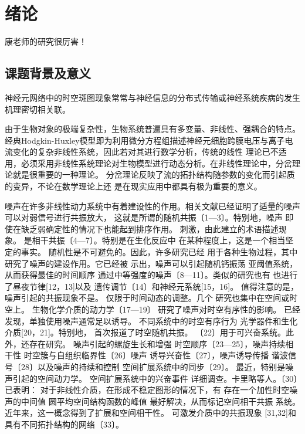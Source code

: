 \documentclass[
    bachelor,
    nofont, %
    pdflinks,
    ]{xjtuthesis}
\begin{document}
	
	
	
	
    \xjtucinfopage
    \xjtueinfopage
    \xjtutoc
	\clearpage

	\xjtucontent
    

		\chapter{绪论}
        
        康老师的研究\cite{xie2008change}很厉害！
        
        \section{课题背景及意义}
        神经元网络中的时空斑图现象常常与神经信息的分布式传输或神经系统疾病的发生机理密切相关联。

\medskip
        由于生物对象的极端复杂性，生物系统普遍具有多变量、非线性、强耦合的特点。经典Hodgkin-Huxley模型即为利用微分方程组描述神经元细胞跨膜电压与离子电流变化的复杂非线性系统，因此若对其进行数学分析，传统的线性
理论已不适用，必须采用非线性系统理论对生物模型进行动态分析。在非线性理论中，分岔理论就是很重要的一种理论。
\medskip
分岔理论反映了流的拓扑结构随参数的变化而引起质的变异，不论在数学理论上还
是在现实应用中都具有极为重要的意义。


噪声在许多非线性动力系统中有着建设性的作用。相关文献已经证明了适量的噪声可以对弱信号进行共振放大，
这就是所谓的随机共振〔1—3〕。特别地，噪声
即使在缺乏弱确定性的情况下也能起到排序作用。
刺激，由此建立的术语描述现象。
是相干共振〔4—7〕。特别是在生化反应中
在某种程度上，这是一个相当坚定的事实。
随机性是不可避免的。因此，许多研究已经
用于各种生物过程，其中
研究了噪声的建设作用。它已经被
示出，噪声可以引起随机钙振荡
亚阈值系统，从而获得最佳的时间顺序
通过中等强度的噪声〔8—11〕。类似的研究也有
也进行了昼夜节律[12，13]以及
遗传调节〔14〕和神经元系统[15，16]。
值得注意的是，噪声引起的共振现象不是。
仅限于时间动态的调整。几个
研究也集中在空间或时空上。
生物化学介质的动力学〔17—19〕
研究了噪声对时空有序性的影响。
已经发现，单独使用噪声通常足以诱导。
不同系统中的时空有序行为
光学器件和生化介质[20，21]。特别地，
首次报道了时空随机共振。
〔22〕用于可兴奋系统。此外，还存在研究。
噪声引起的螺旋生长和增强
时空顺序〔23—25〕，噪声持续相干性
时空簇与自组织临界性〔26〕噪声
诱导兴奋性〔27〕，噪声诱导传播
谐波信号〔28〕以及噪声的持续和控制
空间扩展系统中的同步〔29〕。
最近，特别是噪声引起的空间动力学。
空间扩展系统中的兴奋事件
详细调查。卡里略等人。〔30〕已表明：
对于非线性介质，在形成不稳定图形的情况下，有
存在一个加性时空噪声的中间值
圆平均空间结构函数的峰值
最好解决，从而标记空间相干共振
系统。近年来，这一概念得到了扩展和空间相干性。
可激发介质中的共振现象
[31,32]和具有不同拓扑结构的网络〔33〕。
\end{document}

